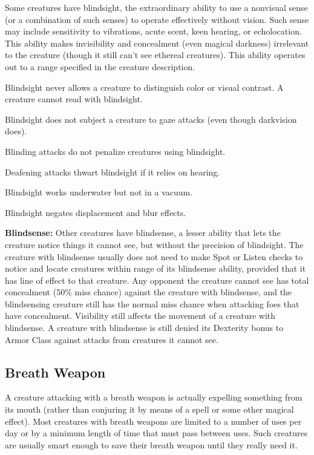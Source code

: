 Some creatures have blindsight, the extraordinary ability to use a nonvisual sense 
(or a combination of such senses) to operate effectively without vision. Such sense 
may include sensitivity to vibrations, acute scent, keen hearing, or echolocation. 
This ability makes invisibility and concealment (even magical darkness) irrelevant 
to the creature (though it still can't see ethereal creatures). This ability operates 
out to a range specified in the creature description.

\begin{itemize*}
\item Blindsight never allows a creature to distinguish color or visual contrast. A creature cannot read with blindsight.
\item Blindsight does not subject a creature to gaze attacks (even though darkvision does).
\item Blinding attacks do not penalize creatures using blindsight. 
\item Deafening attacks thwart blindsight if it relies on hearing.
\item Blindsight works underwater but not in a vacuum.
\item Blindsight negates displacement and blur effects.
\end{itemize*}

\textbf{Blindsense:} Other creatures have blindsense, a lesser ability that lets 
the creature notice things it cannot see, but without the precision of blindsight. 
The creature with blindsense usually does not need to make Spot or Listen checks 
to notice and locate creatures within range of its blindsense ability, provided 
that it has line of effect to that creature. Any opponent the creature cannot see 
has total concealment (50\% miss chance) against the creature with blindsense, 
and the blindsensing creature still has the normal miss chance when attacking foes 
that have concealment. Visibility still affects the movement of a creature with 
blindsense. A creature with blindsense is still denied its Dexterity bonus to Armor 
Class against attacks from creatures it cannot see.

\subsection{Breath Weapon}

A creature attacking with a breath weapon is actually expelling something from 
its mouth (rather than conjuring it by means of a spell or some other magical effect). 
Most creatures with breath weapons are limited to a number of uses per day or by 
a minimum length of time that must pass between uses. Such creatures are usually 
smart enough to save their breath weapon until they really need it.

